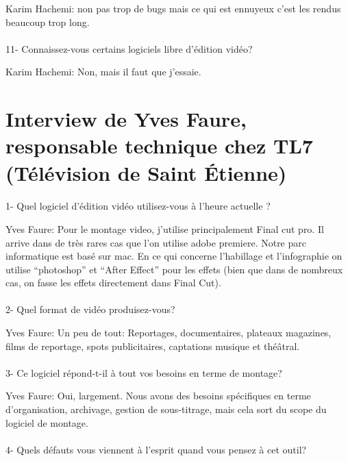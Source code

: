 Karim Hachemi: non pas trop de bugs mais ce qui est ennuyeux c'est les
rendus beaucoup trop long.

\paragraph{}
11- Connaissez-vous certains logiciels libre d'édition vidéo?

Karim Hachemi: Non, mais il faut que j'essaie.

\newpage\section*{Interview de Yves Faure, responsable technique chez TL7
(Télévision de Saint Étienne)}

\paragraph{}
1-  Quel logiciel d'édition vidéo utilisez-vous à l'heure actuelle ?

Yves Faure: Pour le montage video, j'utilise principalement Final cut pro. Il
arrive dans de très rares cas que l'on utilise adobe premiere. Notre
parc informatique est basé sur mac. En ce qui concerne l'habillage et
l'infographie on utilise ``photoshop'' et  ``After Effect'' pour les effets (bien
que dans de nombreux cas, on fasse les effets directement dans Final Cut).

\paragraph{}
2- Quel format de vidéo produisez-vous?

Yves Faure: Un peu de tout: Reportages, documentaires, plateaux magazines, films de reportage, spots
publicitaires, captations musique et théâtral.

\paragraph{}
3- Ce logiciel répond-t-il à tout vos besoins en terme de montage?

Yves Faure: Oui, largement. Nous avons des besoins spécifiques en terme d'organisation,
archivage, gestion de sous-titrage, mais cela sort du scope du logiciel de
montage.

\paragraph{}
4- Quels défauts vous viennent à l'esprit quand vous pensez à cet outil?

